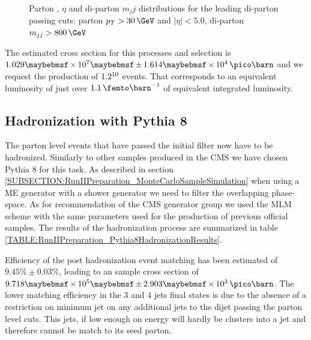 \begin{figure}[!htp]
\caption[Key variables of events passing the parton level filter]{Parton \pt, $\eta$ and di-parton $m_jj$ distributions for the leading di-parton passing cuts: parton $p_{T}>30\,\GeV$ and $|\eta|<5.0$, di-parton $m_{jj}>800\,\GeV$}
\label{FIGURE:RunIIPreparation_PassPartonFilterDistributions}
\end{figure}

The estimated cross section for this processes and selection is $1.029 \times 10^7 \pm 1.614 \times 10^4 \,\pico\barn$ and we request the production of $1.2 \time 10^{10}$ events. That corresponds to an equivalent luminosity of just over $1.1\,\femto\barn^{-1}$ of equivalent integrated luminosity. 

\subsection{Hadronization with Pythia 8}
\label{SUBSECTION:RunIIPreparation_HadronizationWithPythia8}


The parton level events that have passed the initial filter now have to be hadronized. Similarly to other samples produced in the \gls{CMS} we have chosen Pythia 8 for this task. As described in section \ref{SUBSECTION:RunIIPreparation_MonteCarloSampleSimulation} when using a \gls{ME} generator with a shower generator we need to filter the overlapping phase-space. As for recommendation of the \gls{CMS} generator group we used the MLM scheme with the same parameters used for the production of previous official samples. The results of the hadronization process are summarized in table \ref{TABLE:RunIIPreparation_Pythia8HadronizationResults}.



Efficiency of the post hadronization event matching has been estimated of $9.45\% \pm 0.03\%$, leading to an sample cross section of $9.718 \times 10^5 \pm 2.903 \times 10^3\,\pico\barn$. The lower matching efficiency in the 3 and 4 jets final states is due to the absence of a restriction on minimum jet \pt on any additional jets to the dijet passing the parton level cuts. This jets, if low enough on energy will hardly be clusters into a jet and therefore cannot be match to its seed parton.

